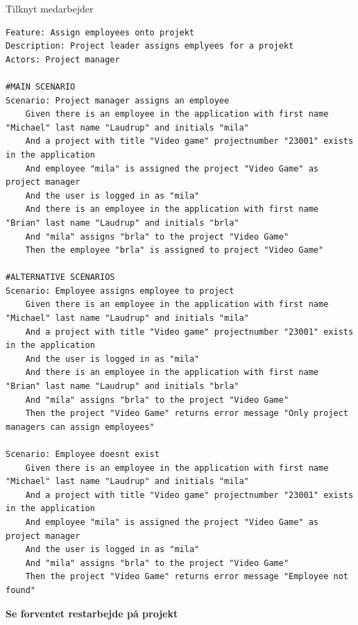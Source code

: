 \begin{listing}[H]
    \centering
    \caption{Tilknyt medarbejder}\label{lst:assign_employ}
    \begin{verbatim}
Feature: Assign employees onto projekt
Description: Project leader assigns emplyees for a projekt
Actors: Project manager

#MAIN SCENARIO
Scenario: Project manager assigns an employee
    Given there is an employee in the application with first name "Michael" last name "Laudrup" and initials "mila"
    And a project with title "Video game" projectnumber "23001" exists in the application
    And employee "mila" is assigned the project "Video Game" as project manager
    And the user is logged in as "mila"
    And there is an employee in the application with first name "Brian" last name "Laudrup" and initials "brla"
    And "mila" assigns "brla" to the project "Video Game"
    Then the employee "brla" is assigned to project "Video Game"

#ALTERNATIVE SCENARIOS
Scenario: Employee assigns employee to project
    Given there is an employee in the application with first name "Michael" last name "Laudrup" and initials "mila"
    And a project with title "Video game" projectnumber "23001" exists in the application
    And the user is logged in as "mila"
    And there is an employee in the application with first name "Brian" last name "Laudrup" and initials "brla"
    And "mila" assigns "brla" to the project "Video Game"
    Then the project "Video Game" returns error message "Only project managers can assign employees"

Scenario: Employee doesnt exist
    Given there is an employee in the application with first name "Michael" last name "Laudrup" and initials "mila"
    And a project with title "Video game" projectnumber "23001" exists in the application
    And employee "mila" is assigned the project "Video Game" as project manager
    And the user is logged in as "mila"
    And "mila" assigns "brla" to the project "Video Game"
    Then the project "Video Game" returns error message "Employee not found"
    \end{verbatim}
\end{listing}\newpage
\textbf{Se forventet restarbejde på projekt}
